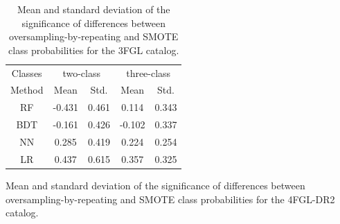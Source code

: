 \documentclass[referee]{aa} %
\begin{document}
\begin{appendix}
\begin{table}[!h]
\caption{
Mean and standard deviation of the significance of differences between 
oversampling-by-repeating and SMOTE class probabilities for the 3FGL catalog.
}
\label{tab:OvsS_3FGL}

\tiny
\centering
\renewcommand{\tabcolsep}{1mm}
\renewcommand{\arraystretch}{1.3}

\begin{tabular}{c c c c c }
\hline
\hline
Classes&\multicolumn{2}{c}{two-class}&\multicolumn{2}{c}{three-class}\\
Method & Mean&Std.&Mean&Std.\\
\hline
RF& -0.431 & 0.461&0.114&0.343\\
\hline
BDT&-0.161&0.426 &-0.102&0.337\\
\hline
NN&0.285&0.419&0.224&0.254\\
\hline
LR&0.437&0.615&0.357&0.325\\
\end{tabular}
\vspace{2mm}
\end{table}


\begin{table}[!h]
\caption{
Mean and standard deviation of the significance of differences between 
oversampling-by-repeating and SMOTE class probabilities for the 4FGL-DR2 catalog.
}
\label{tab:OvsS_4FGL}

\tiny
\centering
\renewcommand{\tabcolsep}{1mm}
\renewcommand{\arraystretch}{1.3}


\end{table}
\end{appendix}
\end{document}
